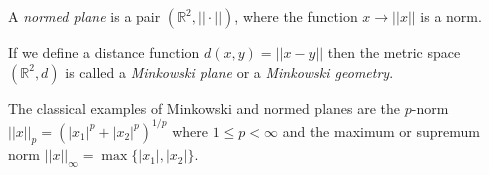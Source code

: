 \documentclass[12pt]{article}
\begin{document}
A \emph{normed plane} is a pair $(\mathbb{R}^2, ||\cdot||)$, where the function 
$x \to ||x||$ is a norm.

If we define a distance function $d(x,y) = ||x-y||$ then 
the metric space  $(\mathbb{R}^2, d)$ is called a \emph{Minkowski plane} or
a \emph{Minkowski geometry}.


The classical examples of Minkowski and normed planes are
the $p$-norm $||x||_p = (|x_1|^p + |x_2|^p)^{1/p}$ where
$1 \leq p < \infty$ and the maximum or supremum norm
$||x||_{\infty} = \max\{|x_1| , |x_2|\}$.

\end{document}
